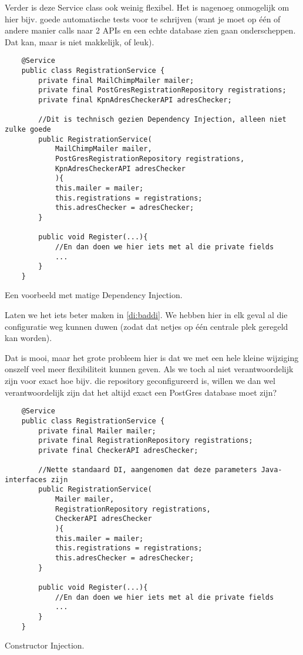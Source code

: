 Verder is deze Service class ook weinig flexibel. Het is nagenoeg onmogelijk om hier bijv. goede
automatische tests voor te schrijven (want je moet op één of andere manier calls naar 2 APIs en een 
echte database zien gaan onderscheppen. Dat kan, maar is niet makkelijk, of leuk).

\begin{listing}[H]
    \begin{verbatim}
    @Service
    public class RegistrationService {
        private final MailChimpMailer mailer;
        private final PostGresRegistrationRepository registrations;
        private final KpnAdresCheckerAPI adresChecker;

        //Dit is technisch gezien Dependency Injection, alleen niet zulke goede
        public RegistrationService(
            MailChimpMailer mailer, 
            PostGresRegistrationRepository registrations,
            KpnAdresCheckerAPI adresChecker
            ){
            this.mailer = mailer;
            this.registrations = registrations;
            this.adresChecker = adresChecker;
        }

        public void Register(...){
            //En dan doen we hier iets met al die private fields
            ...
        }
    }
    \end{verbatim}
    \caption{Een voorbeeld met matige Dependency Injection.}
    \label{di:baddi}
\end{listing}

Laten we het iets beter maken in \ref{di:baddi}. We hebben hier in elk geval al die configuratie 
weg kunnen duwen (zodat dat netjes op één centrale plek geregeld kan worden).

Dat is mooi, maar het grote probleem hier is dat we met een hele kleine wijziging onszelf veel meer
flexibiliteit kunnen geven. Als we toch al niet verantwoordelijk zijn voor exact hoe bijv. die 
repository geconfigureerd is, willen we dan wel verantwoordelijk zijn dat het altijd exact een PostGres
database moet zijn?

\begin{listing}[H]
    \begin{verbatim}
    @Service
    public class RegistrationService {
        private final Mailer mailer;
        private final RegistrationRepository registrations;
        private final CheckerAPI adresChecker;

        //Nette standaard DI, aangenomen dat deze parameters Java-interfaces zijn
        public RegistrationService(
            Mailer mailer, 
            RegistrationRepository registrations,
            CheckerAPI adresChecker
            ){
            this.mailer = mailer;
            this.registrations = registrations;
            this.adresChecker = adresChecker;
        }

        public void Register(...){
            //En dan doen we hier iets met al die private fields
            ...
        }
    }
    \end{verbatim}
    \caption{Constructor Injection.}
    \label{di:constructordi}
\end{listing}

